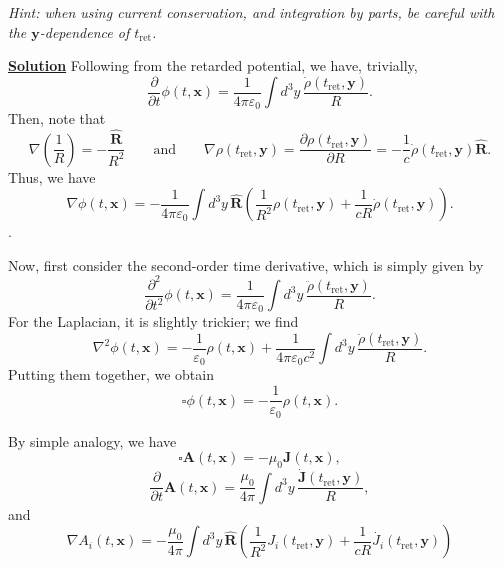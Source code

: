 \textit{Hint: when using current conservation, and integration by parts, be careful with the $\mathbf{y}$-dependence of $t_{\mathrm{ret}}$.}

\noindent \underline{\textbf{Solution}}
Following from the retarded potential, we have, trivially, 
\begin{equation}
  \frac{\partial}{\partial t}\phi(t,\mathbf{x})
  = \frac{1}{4\pi\varepsilon_0}\int d^3y\,
  \frac{\dot{\rho}(t_{\mathrm{ret}},\mathbf{y})}{R}.
\end{equation}
Then, note that 
\begin{equation}
    \nabla\left(\frac{1}{R}\right) = -\frac{\hat{\mathbf{R}}}{R^2} \qquad \text{and} \qquad \nabla \rho(t_\text{ret},\mathbf{y}) = \frac{\partial\rho(t_\text{ret},\mathbf{y})}{\partial R} = -\frac{1}{c}\dot{\rho}(t_{\mathrm{ret}},\mathbf{y})\hat{\mathbf{R}}.
\end{equation}
Thus, we have
\begin{equation}
    \nabla\phi(t,\mathbf{x}) = -\frac{1}{4\pi\varepsilon_0}\int d^3y\,\hat{\mathbf{R}}
  \left(\frac{1}{R^2}\rho(t_{\mathrm{ret}},\mathbf{y})
  + \frac{1}{cR}\dot{\rho}(t_{\mathrm{ret}},\mathbf{y})\right).
\end{equation}.

Now, first consider the second-order time derivative, which is simply given by
\begin{equation}
    \frac{\partial^2}{\partial t^2}\phi(t,\mathbf{x})
  = \frac{1}{4\pi\varepsilon_0}\int d^3y\,
  \frac{\ddot{\rho}(t_{\mathrm{ret}},\mathbf{y})}{R}.
\end{equation}
For the Laplacian, it is slightly trickier; we find
\begin{equation}
    \nabla^2\phi(t,\mathbf{x}) = -\frac{1}{\varepsilon_0}\rho(t,\mathbf{x}) +\frac{1}{4\pi\varepsilon_0c^2}\int d^3y\,
  \frac{\ddot{\rho}(t_{\mathrm{ret}},\mathbf{y})}{R}.
\end{equation}
Putting them together, we obtain
\begin{equation}
    \square\phi(t,\mathbf{x}) = -\frac{1}{\varepsilon_0}\rho(t,\mathbf{x}).
\end{equation}

By simple analogy, we have
\begin{equation}
    \square\mathbf{A}(t,\mathbf{x}) = -\mu_0\mathbf{J}(t,\mathbf{x}),
\end{equation}
\begin{equation}
    \frac{\partial}{\partial t}\mathbf{A}(t,\mathbf{x})
  = \frac{\mu_0}{4\pi}\int d^3y\,
  \frac{\dot{\mathbf{J}}(t_{\mathrm{ret}},\mathbf{y})}{R},
\end{equation}
and
\begin{equation}
    \nabla A_i(t,\mathbf{x}) = -\frac{\mu_0}{4\pi}\int d^3y\,\hat{\mathbf{R}}
  \left(\frac{1}{R^2}J_i(t_{\mathrm{ret}},\mathbf{y})
  + \frac{1}{cR}\dot{J_i}(t_{\mathrm{ret}},\mathbf{y})\right)
\end{equation}

